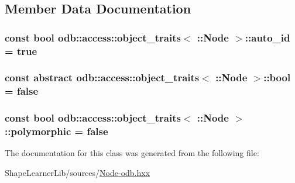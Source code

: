 \subsection{Member Data Documentation}
\hypertarget{classodb_1_1access_1_1object__traits_3_01_1_1_node_01_4_ab370ddaca02392f7bf52d320eafcfed0}{}
\subsubsection[{auto\+\_\+id}]{\setlength{\rightskip}{0pt plus 5cm}const {\bf bool} odb\+::access\+::object\+\_\+traits$<$ \+::{\bf Node} $>$\+::auto\+\_\+id = true\hspace{0.3cm}{\ttfamily [static]}}\label{classodb_1_1access_1_1object__traits_3_01_1_1_node_01_4_ab370ddaca02392f7bf52d320eafcfed0}
\hypertarget{classodb_1_1access_1_1object__traits_3_01_1_1_node_01_4_a432d6a340380ba002f9f3a4ef369ad3b}{}
\subsubsection[{bool}]{\setlength{\rightskip}{0pt plus 5cm}const abstract odb\+::access\+::object\+\_\+traits$<$ \+::{\bf Node} $>$\+::bool = false\hspace{0.3cm}{\ttfamily [static]}}\label{classodb_1_1access_1_1object__traits_3_01_1_1_node_01_4_a432d6a340380ba002f9f3a4ef369ad3b}
\hypertarget{classodb_1_1access_1_1object__traits_3_01_1_1_node_01_4_a87689beec21fac32628559c93cac2764}{}
\subsubsection[{polymorphic}]{\setlength{\rightskip}{0pt plus 5cm}const {\bf bool} odb\+::access\+::object\+\_\+traits$<$ \+::{\bf Node} $>$\+::polymorphic = false\hspace{0.3cm}{\ttfamily [static]}}\label{classodb_1_1access_1_1object__traits_3_01_1_1_node_01_4_a87689beec21fac32628559c93cac2764}


The documentation for this class was generated from the following file\+:\begin{DoxyCompactItemize}
\item 
Shape\+Learner\+Lib/sources/\hyperlink{_node-odb_8hxx}{Node-\/odb.\+hxx}\end{DoxyCompactItemize}
